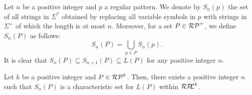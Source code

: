 Let $n$ be a positive integer and $p$ a regular pattern. %
We denote by $S_{n}(p)$ the set of all strings in $\Sigma^{\ast}$ obtained by replacing all variable symbols in $p$
with strings in $\Sigma^{+}$ of which the length is at most $n$.
Moreover, for a set $P \in \mathcal{RP}^{+}$, we define $S_{n}(P)$ as follows:
\[
    S_{n}(P)=\bigcup_{p \in P}S_{n}(p).
\]
It is clear that $S_{n}(P) \subseteq S_{n+1}(P) \subseteq L(P)$ for any positive integer $n$.
%
%

\begin{thm}
    Let $k$ be a positive integer and $P \in \mathcal{RP}^{k}$.
    Then, there exists a positive integer $n$ such that $S_{n}(P)$ is a characteristic set for $L(P)$ within $\mathcal{RP\!\!L}^{k}$.
\end{thm}

